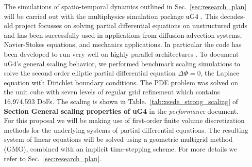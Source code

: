 \label{sec:Project-Details}
The simulations of spatio-temporal dynamics outlined in Sec.~\ref{sec:research_plan} will be carried out with the multiphysics simulation package uG4 \citep{Vogel2013, Heppner13}. This decades-old project focusses on solving partial differential equations on unstructured grids and has been successfully used in applications from diffusion-advection systems, Navier-Stokes equations, and mechanics applications. In particular the code has been developed to run very well on highly parallel architectures \citep{Vogel2013, Heppner13}. To document uG4's general scaling behavior, we performed benchmark scaling simulations to solve the second order elliptic partial differential equation $\Delta \Phi = 0$, the Laplace equation with Dirichlet boundary conditions. The PDE problem was solved on the unit cube with seven levels of regular grid refinement which contains 16,974,593 DoFs. The scaling is shown in Table.~\ref{tab:xsede_strong_scaling} of \textbf{Section General scaling properties of uG4} in the \textit{performance} document. For this proposal we will be making use of first-order finite volume discretization methods for the underlying systems of partial differential equations. The resulting system of linear equations will be solved using a geometric multigrid method (GMG), combined with an implicit time-stepping scheme. For more details we refer to Sec.~\ref{sec:research_plan}.
